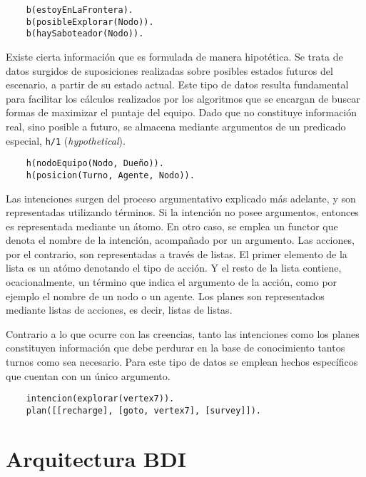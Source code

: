 \documentclass[oneside]{book}
\begin{document}
\begin{verbatim}
    b(estoyEnLaFrontera).
    b(posibleExplorar(Nodo)).
    b(haySaboteador(Nodo)).
\end{verbatim}

Existe cierta información que es formulada de manera hipotética. Se trata de datos 
surgidos de suposiciones realizadas sobre posibles estados futuros del escenario, a partir 
de su estado actual. Este tipo de datos resulta fundamental para facilitar los cálculos 
realizados por los algoritmos que se encargan de buscar formas de maximizar el puntaje 
del equipo. Dado que no constituye información real, sino posible a futuro, se almacena 
mediante argumentos de un predicado especial, \texttt{h/1} (\textit{hypothetical}).

\begin{verbatim}
    h(nodoEquipo(Nodo, Dueño)).
    h(posicion(Turno, Agente, Nodo)).    
\end{verbatim}

Las intenciones surgen del proceso argumentativo explicado más adelante, y son 
representadas utilizando términos. Si la intención no posee argumentos, entonces es 
representada mediante un átomo. En otro caso, se emplea un functor que denota el 
nombre de la intención, acompañado por un argumento. Las acciones, por el contrario, 
son representadas a través de listas. El primer elemento de la lista es un atómo denotando 
el tipo de acción. Y el resto de la lista contiene, ocacionalmente, un término que 
indica el argumento de la acción, como por ejemplo el nombre de un nodo o un agente.
Los planes son representados mediante listas de acciones, es decir, listas de listas.

Contrario a lo que ocurre con las creencias, tanto las intenciones como los planes 
constituyen información que debe perdurar en la base de conocimiento tantos turnos 
como sea necesario. Para este tipo de datos se emplean hechos específicos que cuentan 
con un único argumento.

\begin{verbatim}
    intencion(explorar(vertex7)).
    plan([[recharge], [goto, vertex7], [survey]]).
\end{verbatim}

\section{Arquitectura BDI} %

\label{sec:arquitecturaBDI}
\end{document}
